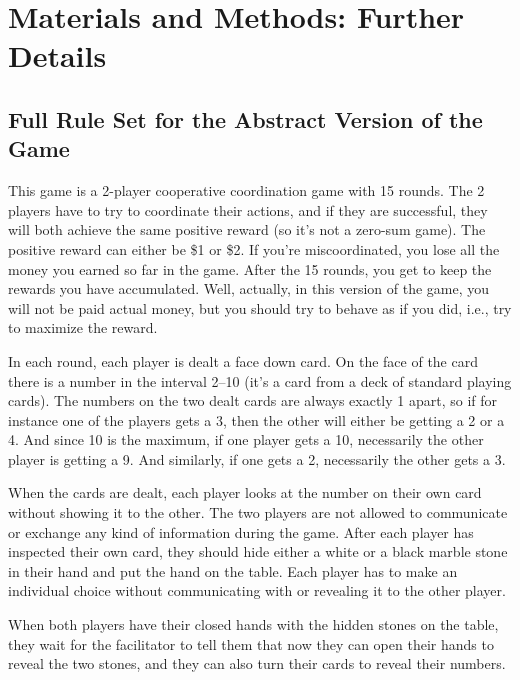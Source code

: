 \section{Materials and Methods: Further Details}
\label{app:materials-methods-further}

\subsection{Full Rule Set for the Abstract Version of the Game}\label{app:dis-rules-full} 

This game is a 2-player cooperative coordination game with 15 rounds. The 2 players have to try to coordinate their actions, and if they are successful, they will both achieve the same positive reward (so it's not a zero-sum game). The positive reward can either be \$1 or \$2. If you're miscoordinated, you lose all the money you earned so far in the game. After the 15 rounds, you get to keep the rewards you have accumulated. Well, actually, in this version of the game, you will not be paid actual money, but you should try to behave as if you did, i.e., try to maximize the reward.

  

In each round, each player is dealt a face down card. On the face of the card there is a number in the interval 2--10 (it's a card from a deck of standard playing cards). The numbers on the two dealt cards are always exactly 1 apart, so if for instance one of the players gets a 3, then the other will either be getting a 2 or a 4. And since 10 is the maximum, if one player gets a 10, necessarily the other player is getting a 9. And similarly, if one gets a 2, necessarily the other gets a 3.  

When the cards are dealt, each player looks at the number on their own card without showing it to the other. The two players are not allowed to communicate or exchange any kind of information during the game. After each player has inspected their own card, they should hide either a white or a black marble stone in their hand and put the hand on the table. Each player has to make an individual choice without communicating with or revealing it to the other player. 

When both players have their closed hands with the hidden stones on the table, they wait for the facilitator to tell them that now they can open their hands to reveal the two stones, and they can also turn their cards to reveal their numbers.  

